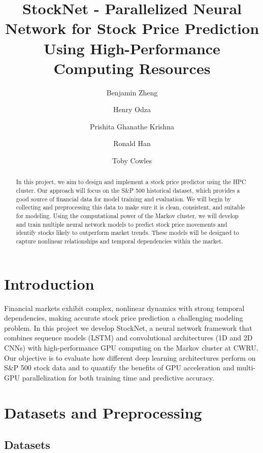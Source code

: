 \documentclass[sigconf]{acmart}
\begin{document}
\title{StockNet - Parallelized Neural Network for Stock Price Prediction Using High-Performance Computing
Resources}

\author{Benjamin Zheng}
\author{Henry Odza}
\author{Prishita Ghanathe Krishna}
\author{Ronald Han}
\author{Toby Cowles}

\begin{abstract}
In this project, we aim to design and implement a stock price predictor using the HPC cluster.
Our approach will focus on the S\&P 500 historical dataset, which provides a good source of
financial data for model training and evaluation. We will begin by collecting and preprocessing
this data to make sure it is clean, consistent, and suitable for modeling. Using the computational
power of the Markov cluster, we will develop and train multiple neural network models to predict
stock price movements and identify stocks likely to outperform market trends. These models will
be designed to capture nonlinear relationships and temporal dependencies within the market.
\end{abstract}

\maketitle
\section{Introduction}

Financial markets exhibit complex, nonlinear dynamics with strong temporal dependencies, making accurate stock price prediction a challenging modeling problem. In this project we develop StockNet, a neural network framework that combines sequence models (LSTM) and convolutional architectures (1D and 2D CNNs) with high-performance GPU computing on the Markov cluster at CWRU. Our objective is to evaluate how different deep learning architectures perform on S\&P 500 stock data and to quantify the benefits of GPU acceleration and multi-GPU parallelization for both training time and predictive accuracy.

\section{Datasets and Preprocessing}

\subsection{Datasets}
\end{document}

